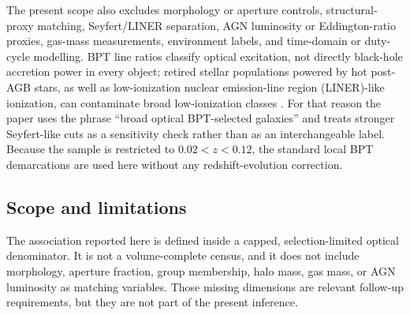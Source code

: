 \documentclass[twocolumn]{aastex631}
\begin{document}
The present scope also excludes morphology or aperture controls, structural-proxy matching, Seyfert/LINER separation, AGN luminosity or Eddington-ratio proxies, gas-mass measurements, environment labels, and time-domain or duty-cycle modelling. BPT line ratios classify optical excitation, not directly black-hole accretion power in every object; retired stellar populations powered by hot post-AGB stars, as well as low-ionization nuclear emission-line region (LINER)-like ionization, can contaminate broad low-ionization classes \citep{cidfernandes2011,stasinska2008,stasinska2015}. For that reason the paper uses the phrase ``broad optical BPT-selected galaxies'' and treats stronger Seyfert-like cuts as a sensitivity check rather than as an interchangeable label. Because the sample is restricted to $0.02<z<0.12$, the standard local BPT demarcations are used here without any redshift-evolution correction.

\subsection{Scope and limitations}
The association reported here is defined inside a capped, selection-limited optical denominator. It is not a volume-complete census, and it does not include morphology, aperture fraction, group membership, halo mass, gas mass, or AGN luminosity as matching variables. Those missing dimensions are relevant follow-up requirements, but they are not part of the present inference.
\end{document}
